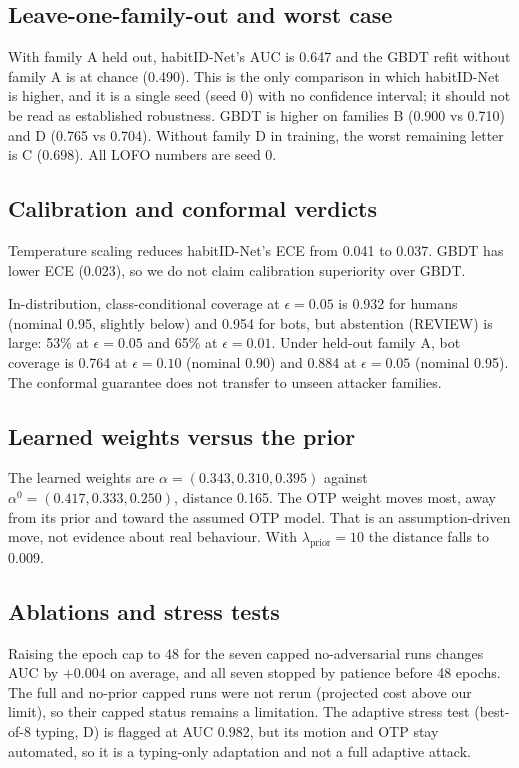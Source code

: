 \documentclass[conference]{IEEEtran}
\begin{document}
\subsection{Leave-one-family-out and worst case}

With family A held out, habitID-Net's AUC is 0.647 and the GBDT refit without family A is at chance (0.490). This is the only comparison in which habitID-Net is higher, and it is a single seed (seed 0) with no confidence interval; it should not be read as established robustness. GBDT is higher on families B (0.900 vs 0.710) and D (0.765 vs 0.704). Without family D in training, the worst remaining letter is C (0.698). All LOFO numbers are seed 0.

\subsection{Calibration and conformal verdicts}

Temperature scaling reduces habitID-Net's ECE from 0.041 to 0.037. GBDT has lower ECE (0.023), so we do not claim calibration superiority over GBDT.

In-distribution, class-conditional coverage at $\epsilon=0.05$ is 0.932 for humans (nominal 0.95, slightly below) and 0.954 for bots, but abstention (REVIEW) is large: 53\% at $\epsilon=0.05$ and 65\% at $\epsilon=0.01$. Under held-out family A, bot coverage is 0.764 at $\epsilon=0.10$ (nominal 0.90) and 0.884 at $\epsilon=0.05$ (nominal 0.95). The conformal guarantee does not transfer to unseen attacker families.

\subsection{Learned weights versus the prior}

The learned weights are $\alpha=(0.343,0.310,0.395)$ against $\alpha^0=(0.417,0.333,0.250)$, distance 0.165. The OTP weight moves most, away from its prior and toward the assumed OTP model. That is an assumption-driven move, not evidence about real behaviour. With $\lambda_{\text{prior}}=10$ the distance falls to 0.009.

\subsection{Ablations and stress tests}



Raising the epoch cap to 48 for the seven capped no-adversarial runs changes AUC by $+0.004$ on average, and all seven stopped by patience before 48 epochs. The full and no-prior capped runs were not rerun (projected cost above our limit), so their capped status remains a limitation. The adaptive stress test (best-of-8 typing, D\*) is flagged at AUC 0.982, but its motion and OTP stay automated, so it is a typing-only adaptation and not a full adaptive attack.
\end{document}
